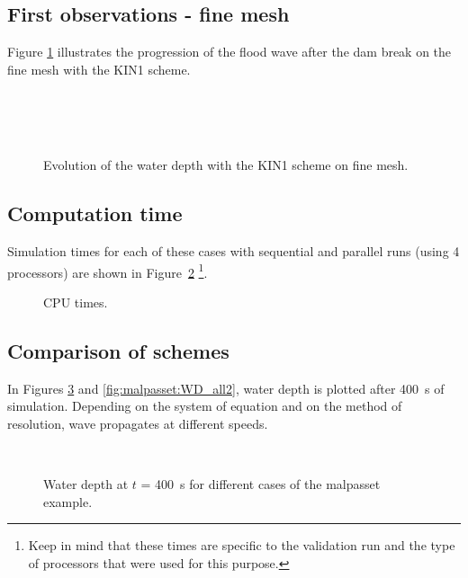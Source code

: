 \subsection{First observations - fine mesh}

Figure \ref{fig:malpasset:WD_fine} illustrates the progression of the flood
wave after the dam break on the fine mesh with the KIN1 scheme.
\begin{figure}[H]
  \centering
  \\
  \\
  \\
  \caption{Evolution of the water depth with the KIN1 scheme on fine mesh.}
  \label{fig:malpasset:WD_fine}
\end{figure}

\subsection{Computation time}

Simulation times for each of these cases with sequential and parallel runs
(using 4 processors) are shown in Figure~\ref{fig:malpasset:cputime}
\footnote{Keep in mind that these times
are specific to the validation run and the type of processors that were used for this purpose.}.

\begin{figure}[h!]
  \centering
  \caption{CPU times.}
  \label{fig:malpasset:cputime}
\end{figure}

\subsection{Comparison of schemes}

In Figures \ref{fig:malpasset:WD_all1} and \ref{fig:malpasset:WD_all2},
water depth is plotted after 400~s of simulation.
Depending on the system of equation and on the method of resolution, wave
propagates at different speeds.

\begin{figure}[H]
  \centering
  \\
  \caption{Water depth at $t$ = 400~s for different cases of the malpasset example.}
  \label{fig:malpasset:WD_all1}
\end{figure}

